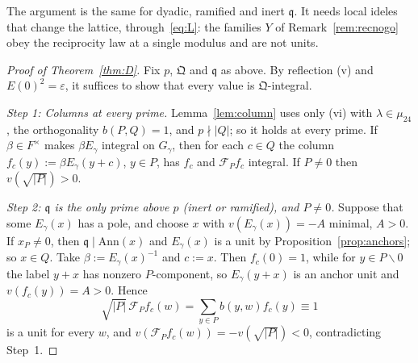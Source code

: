 \documentclass[11pt]{amsart}
\numberwithin{equation}{section}
\theoremstyle{plain}
\theoremstyle{definition}
\theoremstyle{remark}
\begin{document}
The argument is the same for dyadic, ramified and inert \(\mathfrak q\). It needs local ideles that change the lattice, through~\eqref{eq:L}: the families \(Y\) of Remark~\ref{rem:recnogo} obey the reciprocity law at a single modulus and are not units.

\begin{proof}[Proof of Theorem~\ref{thm:D}]
Fix \(p\), \(\mathfrak Q\) and \(\mathfrak q\) as above. By reflection (v) and \(E(0)^2=\varepsilon\), it suffices to show that every value is \(\mathfrak Q\)-integral.

\emph{Step 1: Columns at every prime.} Lemma~\ref{lem:column} uses only (vi) with \(\lambda\in\mu_{24}\), the orthogonality \(b(P,Q)=1\), and \(p\nmid|Q|\); so it holds at every prime. If \(\beta\in F^\times\) makes \(\beta E_\gamma\) integral on \(G_\gamma\), then for each \(c\in Q\) the column \(f_c(y):=\beta E_\gamma(y+c)\), \(y\in P\), has \(f_c\) and \(\mathcal F_Pf_c\) integral. If \(P\ne0\) then \(v(\sqrt{|P|})>0\).

\emph{Step 2: \(\mathfrak q\) is the only prime above \(p\) (inert or ramified), and \(P\ne0\).} Suppose that some \(E_\gamma(x)\) has a pole, and choose \(x\) with \(v(E_\gamma(x))=-A\) minimal, \(A>0\). If \(x_P\ne0\), then \(\mathfrak q\mid\mathrm{Ann}(x)\) and \(E_\gamma(x)\) is a unit by Proposition~\ref{prop:anchors}; so \(x\in Q\). Take \(\beta:=E_\gamma(x)^{-1}\) and \(c:=x\). Then \(f_c(0)=1\), while for \(y\in P\smallsetminus0\) the label \(y+x\) has nonzero \(P\)-component, so \(E_\gamma(y+x)\) is an anchor unit and \(v(f_c(y))=A>0\). Hence
\[\sqrt{|P|}\,\mathcal F_Pf_c(w)=\sum_{y\in P}b(y,w)f_c(y)\equiv1\]
is a unit for every \(w\), and \(v(\mathcal F_Pf_c(w))=-v(\sqrt{|P|})<0\), contradicting Step~1.


\end{proof}
\end{document}
